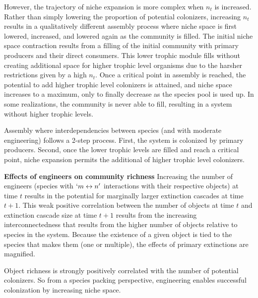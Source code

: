 \documentclass[twocolumn,preprintnumbers,amsmath,amssymb,superscriptaddress]{revtex4}
\begin{document}
However, the trajectory of niche expansion is more complex when $n_t$ is increased.
Rather than simply lowering the proportion of potential colonizers, increasing $n_t$ results in a qualitatively different assembly process where niche space is first lowered, increased, and lowered again as the community is filled.
The initial niche space contraction results from a filling of the initial community with primary producers and their direct consumers.
This lower trophic module fills without creating additional space for higher trophic level organisms due to the harsher restrictions given by a high $n_t$.
Once a critical point in assembly is reached, the potential to add higher trophic level colonizers is attained, and niche space increases to a maximum, only to finally decrease as the species pool is used up.
In some realizations, the community is never able to fill, resulting in a system without higher trophic levels.

Assembly where interdependencies between species (and with moderate engineering) follows a 2-step process.
First, the system is colonized by primary producers.
Second, once the lower trophic levels are filled and reach a critical point, niche expansion permits the additional of higher trophic level colonizers.








{\bf Effects of engineers on community richness}
Increasing the number of engineers (species with $ `m \leftrightarrow n'$ interactions with their respective objects) at time $t$ results in the potential for marginally larger extinction cascades at time $t+1$.
This weak positive correlation between the number of objects at time $t$ and extinction cascade size at time $t+1$ results from the increasing interconnectedness that results from the higher number of objects relative to species in the system.
Because the existence of a given object is tied to the species that makes them (one or multiple), the effects of primary extinctions are magnified.


Object richness is strongly positively correlated with the number of potential colonizers.
So from a species packing perspective, engineering enables successful colonization by increasing niche space.
\end{document}
